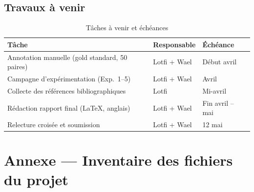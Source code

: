 \documentclass[a4paper,11pt]{article}
\begin{document}
\subsection{Travaux à venir}

\begin{table}[H]
  \centering
  \small
  \begin{tabular}{lll}
    \toprule
    \textbf{Tâche} & \textbf{Responsable} & \textbf{Échéance} \\
    \midrule
    Annotation manuelle (gold standard, 50 paires) & Lotfi + Wael & Début avril \\
    Campagne d'expérimentation (Exp.\ 1--5)        & Lotfi + Wael & Avril \\
    Collecte des références bibliographiques       & Lotfi        & Mi-avril \\
    Rédaction rapport final (\LaTeX, anglais)      & Lotfi + Wael & Fin avril -- mai \\
    Relecture croisée et soumission                & Lotfi + Wael & 12 mai \\
    \bottomrule
  \end{tabular}
  \caption{Tâches à venir et échéances}
\end{table}

\newpage
\appendix
\section{Annexe — Inventaire des fichiers du projet}
\end{document}
